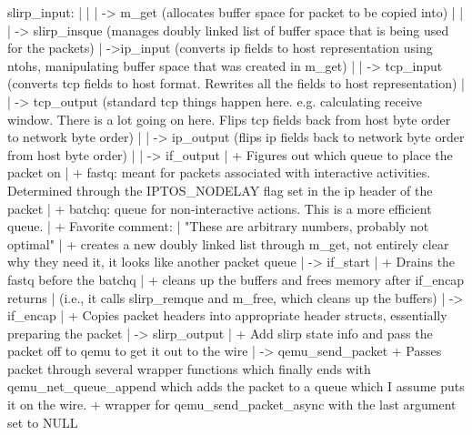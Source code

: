 \documentclass[11pt,pdftex,twocolumn]{article}
\begin{document}
slirp_input:
|          |
|           -> m_get (allocates buffer space for packet to be copied into)
|               |
|                -> slirp_insque (manages doubly linked list of buffer space that is being used for the packets)
|
 ->ip_input (converts ip fields to host representation using ntohs, manipulating buffer space that was created in m_get)
    |
    |
     -> tcp_input (converts tcp fields to host format. Rewrites all the fields to host representation)
         |
         |
          -> tcp_output (standard tcp things happen here. e.g. calculating receive window. There is a lot going on here. Flips tcp fields back from host byte order to network byte order)
              |
              |
               -> ip_output (flips ip fields back to network byte order from host byte order)
                   |
                   |
                    -> if_output 
                        |     + Figures out which queue to place the packet on
                        |         + fastq: meant for packets associated with interactive activities. Determined through the IPTOS_NODELAY flag set in the ip header of the packet
                        |         + batchq: queue for non-interactive actions. This is a more efficient queue.
                        |     + Favorite comment:
                        |           "These are arbitrary numbers, probably not optimal"
                        |     + creates a new doubly linked list through m_get, not entirely clear why they need it, it looks like another packet queue
                        |
                         -> if_start
                             |    + Drains the fastq before the batchq
                             |    + cleans up the buffers and frees memory after if_encap returns
                             |      (i.e., it calls slirp_remque and m_free, which cleans up the buffers)
                             |
                              -> if_encap
                                  |    + Copies packet headers into appropriate header structs, essentially preparing the packet
                                  |
                                   -> slirp_output
                                       |         + Add slirp state info and pass the packet off to qemu to get it out to the wire
                                       |
                                        -> qemu_send_packet
                                                       + Passes packet through several wrapper functions which finally ends with qemu_net_queue_append which adds the packet to a queue which I assume puts it on the wire.
                                                        + wrapper for qemu_send_packet_async with the last argument set to NULL
\end{document}
